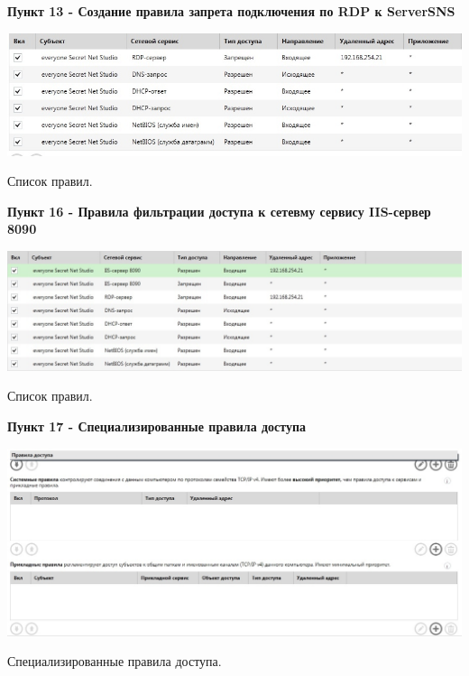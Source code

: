 \documentclass[a4paper,14pt]{extarticle}
\begin{document}
    \textbf{Пункт 13 - Создание правила запрета подключения по RDP к ServerSNS}
    \begin{center}
        \includegraphics[scale=0.55]{pics/13.jpg}

       Список правил.
    \end{center}

    \textbf{Пункт 16 - Правила фильтрации доступа к сетевму сервису IIS-сервер 8090}
    \begin{center}
        \includegraphics[scale=0.45]{pics/16.jpg}

       Список правил.
    \end{center}
    
    \textbf{Пункт 17 - Специализированные правила доступа }
    \begin{center}
        \includegraphics[scale=0.45]{pics/17.jpg}

        Специализированные правила доступа.
    \end{center}
\end{document}
